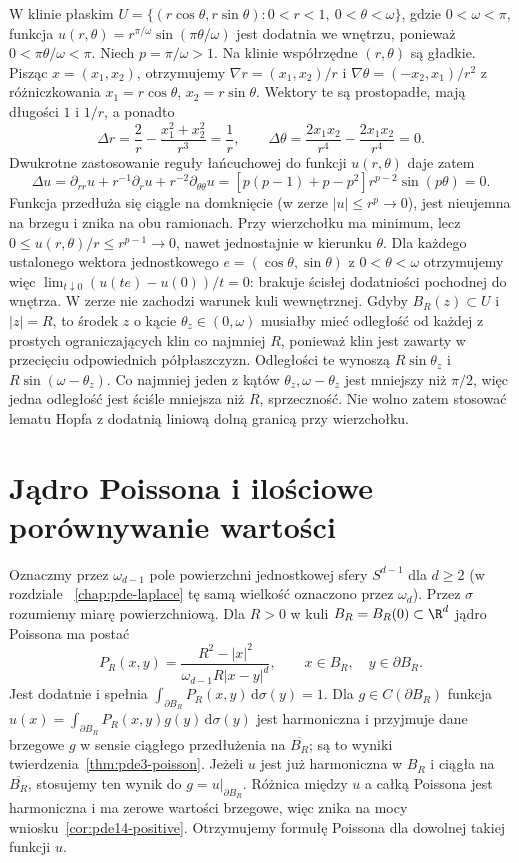 \begin{przyklad}
\label{ex:pde14-cusp}
W klinie płaskim $U=\{(r\cos\theta,r\sin\theta):
0<r<1,\ 0<\theta<\omega\}$, gdzie $0<\omega<\pi$,
funkcja $u(r,\theta)=r^{\pi/\omega}\sin(\pi\theta/\omega)$
jest dodatnia we wnętrzu, ponieważ $0<\pi\theta/\omega<\pi$.
Niech $p=\pi/\omega>1$. Na klinie współrzędne
$(r,\theta)$ są gładkie. Pisząc $x=(x_1,x_2)$,
otrzymujemy $\nabla r=(x_1,x_2)/r$ i
$\nabla\theta=(-x_2,x_1)/r^2$ z różniczkowania
$x_1=r\cos\theta$, $x_2=r\sin\theta$.
Wektory te są prostopadłe, mają długości $1$ i $1/r$,
a ponadto
\[
 \Delta r=\frac{2}{r}-\frac{x_1^2+x_2^2}{r^3}=\frac1r,
 \qquad
 \Delta\theta=\frac{2x_1x_2}{r^4}-\frac{2x_1x_2}{r^4}=0.
\]
Dwukrotne zastosowanie reguły łańcuchowej do funkcji
$u(r,\theta)$ daje zatem
\[
 \Delta u=\partial_{rr}u+r^{-1}\partial_r u
 +r^{-2}\partial_{\theta\theta}u
 =[p(p-1)+p-p^2]r^{p-2}\sin(p\theta)=0.
\]
Funkcja przedłuża się ciągle na domknięcie (w zerze
$|u|\le r^p\to0$), jest nieujemna na brzegu i znika
na obu ramionach. Przy wierzchołku ma minimum, lecz
$0\le u(r,\theta)/r\le r^{p-1}\to0$, nawet jednostajnie
w kierunku $\theta$. Dla każdego ustalonego wektora
jednostkowego $e=(\cos\theta,\sin\theta)$ z $0<\theta<\omega$
otrzymujemy więc
$\lim_{t\downarrow0}(u(te)-u(0))/t=0$:
brakuje ścisłej dodatniości pochodnej do wnętrza.
W zerze nie zachodzi warunek kuli wewnętrznej.
Gdyby $B_R(z)\subset U$ i $|z|=R$, to środek $z$
o kącie $\theta_z\in(0,\omega)$ musiałby mieć odległość
od każdej z prostych ograniczających klin co najmniej $R$,
ponieważ klin jest zawarty w przecięciu odpowiednich
półpłaszczyzn. Odległości te wynoszą
$R\sin\theta_z$ i $R\sin(\omega-\theta_z)$.
Co najmniej jeden z kątów $\theta_z,\omega-\theta_z$
jest mniejszy niż $\pi/2$, więc jedna odległość jest
ściśle mniejsza niż $R$, sprzeczność.
Nie wolno zatem stosować lematu Hopfa z dodatnią liniową
dolną granicą przy wierzchołku.
\end{przyklad}

\section{Jądro Poissona i ilościowe porównywanie wartości}
\label{sec:pde14-poisson}
Oznaczmy przez $\omega_{d-1}$ pole powierzchni
jednostkowej sfery $S^{d-1}$ dla $d\ge2$ (w rozdziale
~\ref{chap:pde-laplace} tę samą wielkość oznaczono przez
$\omega_d$). Przez $\sigma$ rozumiemy miarę powierzchniową.
Dla $R>0$ w kuli
$B_R=B_R(0)\subset\R^d$ jądro Poissona ma postać
\[
 P_R(x,y)=\frac{R^2-|x|^2}{\omega_{d-1}R|x-y|^d},
 \qquad x\in B_R,\quad y\in\partial B_R.
\]
Jest dodatnie i spełnia
$\int_{\partial B_R}P_R(x,y)\,\mathrm d\sigma(y)=1$.
Dla $g\in C(\partial B_R)$ funkcja
$u(x)=\int_{\partial B_R}P_R(x,y)g(y)\,\mathrm d\sigma(y)$
jest harmoniczna i przyjmuje dane brzegowe $g$ w sensie
ciągłego przedłużenia na $\overline{B_R}$; są to wyniki
twierdzenia~\ref{thm:pde3-poisson}. Jeżeli $u$ jest już
harmoniczna w $B_R$ i ciągła na $\overline{B_R}$,
stosujemy ten wynik do $g=u|_{\partial B_R}$.
Różnica między $u$ a całką Poissona jest harmoniczna
i ma zerowe wartości brzegowe, więc znika na mocy
wniosku~\ref{cor:pde14-positive}. Otrzymujemy formułę
Poissona dla dowolnej takiej funkcji $u$.

